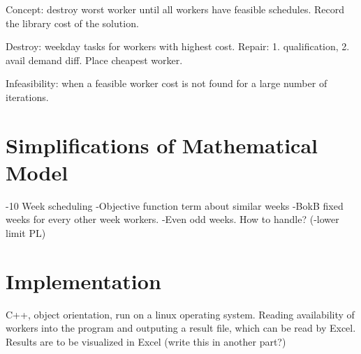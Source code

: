 Concept: destroy worst worker until all workers have feasible schedules. Record the library cost of the solution. 

Destroy: weekday tasks for workers with highest cost.
Repair: 1. qualification, 2. avail demand diff. Place cheapest worker.

Infeasibility: when a feasible worker cost is not found for a large number of iterations. 

\section{Simplifications of Mathematical Model}
-10 Week scheduling
-Objective function term about similar weeks
-BokB fixed weeks for every other week workers.
-Even odd weeks. How to handle?
(-lower limit PL)

\section{Implementation}
C++, object orientation, run on a linux operating system. Reading availability of workers into the program and outputing a result file, which can be read by Excel. Results are to be visualized in Excel (write this in another part?)

